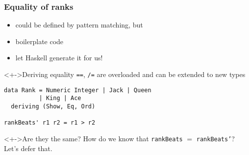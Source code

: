 \documentclass{beamer}
\begin{document}
\begin{frame}[fragile]
  \frametitle{Equality of ranks}
  \begin{itemize}
  \item could be defined by pattern matching, but
  \item boilerplate code
  \item let Haskell generate it for us!
  \end{itemize}
  \begin{block}<+->{Deriving equality}
    \texttt{==}, \texttt{/=} are overloaded and can be extended to
    new types
\begin{verbatim}
data Rank = Numeric Integer | Jack | Queen
          | King | Ace
  deriving (Show, Eq, Ord)

rankBeats' r1 r2 = r1 > r2
\end{verbatim}
  \end{block}
  \begin{block}<+->{Are they the same?}
    How do we know that \texttt{rankBeats} $=$ \texttt{rankBeats'}?
    Let's defer that.
  \end{block}
\end{frame}
\end{document}
